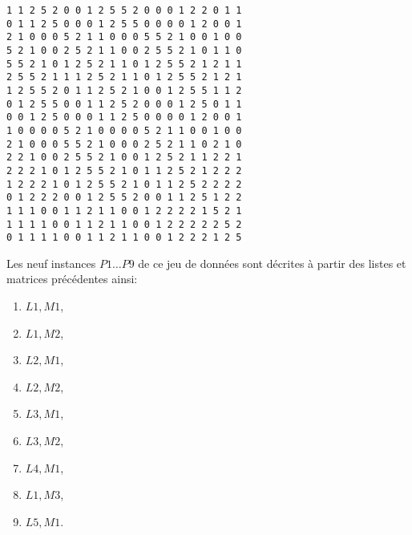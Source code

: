 \documentclass[a4paper,francais]{article}
\theoremstyle{definition}
\begin{document}
\begin{enumerate}[label=(M\arabic*)]
\begin{verbatim}
1 1 2 5 2 0 0 1 2 5 5 2 0 0 0 1 2 2 0 1 1 
0 1 1 2 5 0 0 0 1 2 5 5 0 0 0 0 1 2 0 0 1 
2 1 0 0 0 5 2 1 1 0 0 0 5 5 2 1 0 0 1 0 0 
5 2 1 0 0 2 5 2 1 1 0 0 2 5 5 2 1 0 1 1 0 
5 5 2 1 0 1 2 5 2 1 1 0 1 2 5 5 2 1 2 1 1 
2 5 5 2 1 1 1 2 5 2 1 1 0 1 2 5 5 2 1 2 1 
1 2 5 5 2 0 1 1 2 5 2 1 0 0 1 2 5 5 1 1 2 
0 1 2 5 5 0 0 1 1 2 5 2 0 0 0 1 2 5 0 1 1 
0 0 1 2 5 0 0 0 1 1 2 5 0 0 0 0 1 2 0 0 1 
1 0 0 0 0 5 2 1 0 0 0 0 5 2 1 1 0 0 1 0 0 
2 1 0 0 0 5 5 2 1 0 0 0 2 5 2 1 1 0 2 1 0 
2 2 1 0 0 2 5 5 2 1 0 0 1 2 5 2 1 1 2 2 1 
2 2 2 1 0 1 2 5 5 2 1 0 1 1 2 5 2 1 2 2 2 
1 2 2 2 1 0 1 2 5 5 2 1 0 1 1 2 5 2 2 2 2 
0 1 2 2 2 0 0 1 2 5 5 2 0 0 1 1 2 5 1 2 2 
1 1 1 0 0 1 1 2 1 1 0 0 1 2 2 2 2 1 5 2 1 
1 1 1 1 0 0 1 1 2 1 1 0 0 1 2 2 2 2 2 5 2 
0 1 1 1 1 0 0 1 1 2 1 1 0 0 1 2 2 2 1 2 5
\end{verbatim}
\end{enumerate}

Les neuf instances $P1 \dots P9$ de ce jeu de données
sont décrites à partir des listes et matrices précédentes
ainsi:
\begin{enumerate}[label=(P\arabic*)]
\item $L1, M1$,
\item $L1, M2$,
\item $L2, M1$,
\item $L2, M2$,
\item $L3, M1$,
\item $L3, M2$,
\item $L4, M1$,
\item $L1, M3$,
\item $L5, M1$.
\end{enumerate}
\end{document}
